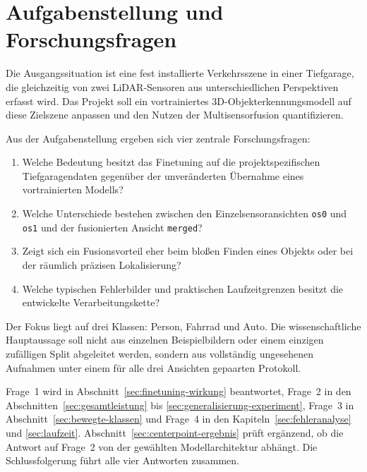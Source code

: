 \section{Aufgabenstellung und Forschungsfragen}

Die Ausgangssituation ist eine fest installierte Verkehrsszene in einer Tiefgarage, die gleichzeitig von zwei LiDAR-Sensoren aus unterschiedlichen Perspektiven erfasst wird. Das Projekt soll ein vortrainiertes 3D-Objekterkennungsmodell auf diese Zielszene anpassen und den Nutzen der Multisensorfusion quantifizieren.

Aus der Aufgabenstellung ergeben sich vier zentrale Forschungsfragen:

\begin{enumerate}
    \item Welche Bedeutung besitzt das Finetuning auf die projektspezifischen Tiefgaragendaten gegenüber der unveränderten Übernahme eines vortrainierten Modells?
    \item Welche Unterschiede bestehen zwischen den Einzelsensoransichten \texttt{os0} und \texttt{os1} und der fusionierten Ansicht \texttt{merged}?
    \item Zeigt sich ein Fusionsvorteil eher beim bloßen Finden eines Objekts oder bei der räumlich präzisen Lokalisierung?
    \item Welche typischen Fehlerbilder und praktischen Laufzeitgrenzen besitzt die entwickelte Verarbeitungskette?
\end{enumerate}

Der Fokus liegt auf drei Klassen: Person, Fahrrad und Auto. Die wissenschaftliche Hauptaussage soll nicht aus einzelnen Beispielbildern oder einem einzigen zufälligen Split abgeleitet werden, sondern aus vollständig ungesehenen Aufnahmen unter einem für alle drei Ansichten gepaarten Protokoll.

Frage~1 wird in Abschnitt~\ref{sec:finetuning-wirkung} beantwortet, Frage~2 in den Abschnitten~\ref{sec:gesamtleistung} bis \ref{sec:generalisierung-experiment}, Frage~3 in Abschnitt~\ref{sec:bewegte-klassen} und Frage~4 in den Kapiteln~\ref{sec:fehleranalyse} und \ref{sec:laufzeit}. Abschnitt~\ref{sec:centerpoint-ergebnis} prüft ergänzend, ob die Antwort auf Frage~2 von der gewählten Modellarchitektur abhängt. Die Schlussfolgerung führt alle vier Antworten zusammen.
